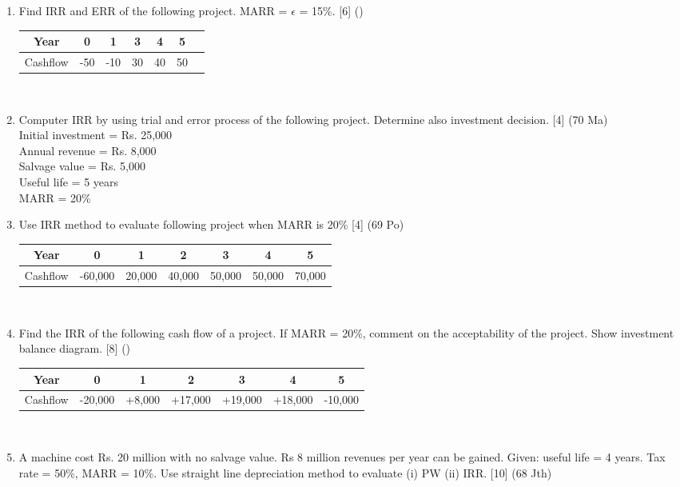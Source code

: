 \documentclass[12pt]{article}
\begin{document}
\begin{enumerate}[noitemsep, topsep = 0pt]
	\item Find IRR and ERR of the following project. MARR = $\epsilon$ = 15\%. \hfill [6] ()
	\begin{tabular}{|c|c|c|c|c|c|c|}
		\hline
		Year & 0 & 1 & 3 & 4 & 5\\ \hline
		Cashflow & -50 & -10 & 30 & 40 & 50\\ \hline
	\end{tabular}\\[0pt]
	
	\item Computer IRR by using trial and error process of the following project. Determine also investment decision. \hfill [4] (70 Ma)\\
	Initial investment = Rs. 25,000\\
	Annual revenue = Rs. 8,000\\
	Salvage value = Rs. 5,000\\
	Useful life = 5 years\\
	MARR = 20\%	
	
	\item Use IRR method to evaluate following project when MARR is 20\% \hfill [4] (69 Po)\\
	\begin{tabular}{|c|c|c|c|c|c|c|}
		\hline
		Year & 0 & 1 & 2 & 3 & 4 & 5\\ \hline
		Cashflow & -60,000 & 20,000 & 40,000 & 50,000 & 50,000 & 70,000\\ \hline
	\end{tabular}\\[0pt]
	
	\item Find the IRR of the following cash flow of a project. If MARR = 20\%, comment on the acceptability of the project. Show investment balance diagram. \hspace{4cm} [8] ()
	\begin{tabular}{|c|c|c|c|c|c|c|}
		\hline
		Year & 0 & 1 & 2 & 3 & 4 & 5\\ \hline
		Cashflow & -20,000 & +8,000 & +17,000 & +19,000 & +18,000 & -10,000\\ \hline
	\end{tabular}\\[0pt]
	
	\item A machine cost Rs. 20 million with no salvage value. Rs 8 million revenues per year can be gained. Given: useful life = 4 years. Tax rate = 50\%, MARR = 10\%. Use straight line depreciation method to evaluate (i) PW (ii) IRR. \hfill [10] (68 Jth)
\end{enumerate}
\end{document}

